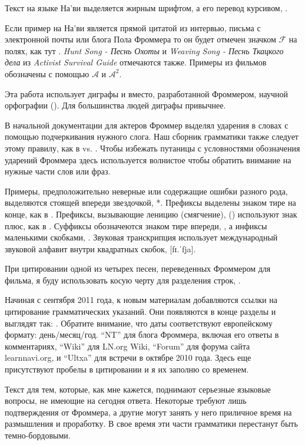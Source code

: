 Текст на языке На'ви выделяется жирным шрифтом, а его перевод
курсивом,  .

Если пример на На'ви является прямой цитатой из интервью, письма
с электронной почты или блога Пола Фроммера то он будет отмечен
значком
$\mathcal{F}$ на полях, как тут . 
\textit{Hunt Song - Песнь Охоты} и \textit{Weaving Song - Песнь
Ткацкого дела} из
\textit{Activist Survival Guide} отмечаются также. Примеры из
фильмов обозначены с помощью $\mathcal{A}$ и $\mathcal{A}^2$.

Эта работа использует диграфы  и  вместо,
разработанной Фроммером, научной орфографии
(). Для большинства людей диграфы
привычнее.

В начальной документации для актеров Фроммер выделял ударения в
словах с помощью подчеркивания нужного слога. Наш сборник
грамматики также следует этому правилу, как в 
 vs. 
. Чтобы избежать путаницы с условностями обозначения
ударений Фроммера здесь используется волнистое
 чтобы обратить внимание на нужные части
слов или фраз.

Примеры, предположительно неверные или содержащие ошибки разного
рода, выделяются стоящей впереди звездочкой, *.
Префиксы выделены знаком тире на конце, как в . Префиксы,
вызывающие леницию (смягчение), ()
используют знак плюс, как в .
Суффиксы обозначеются знаком тире впереди, , а инфиксы
маленькими скобками, . Звуковая транскрипция
использует международный звуковой алфавит внутри квадратных
скобок, [fɪ.ˈfja].

При цитировании одной из четырех песен, переведенных Фроммером
для фильма, я буду использовать косую черту для разделения
строк, .

Начиная с сентября 2011 года, к новым материалам добавляются
ссылки на цитирование грамматических указаний. Они появляются в
конце разделы и выглядят так:
.
Обратите внимание, что даты соответствуют европейскому формату:
день/месяц/год.
``NT'' для блога Фроммера, включая его ответы в комментариях,
``Wiki'' для LN.org Wiki, ``Forum'' для форума сайта
learnnavi.org, и
``Ultxa'' для встречи в октябре 2010 года. Здесь еще
присутствуют пробелы в цитировании и я их заполню со временем.

Текст  для тем, которые, как
мне кажется, поднимают серьезные языковые вопросы, не имеющие на
сегодня ответа. Некоторые требуют лишь подтверждения от
Фроммера, а другие могут занять у него приличное время на
размышления и проработку. В свое время эти части грамматики
перестанут быть темно-бордовыми.


